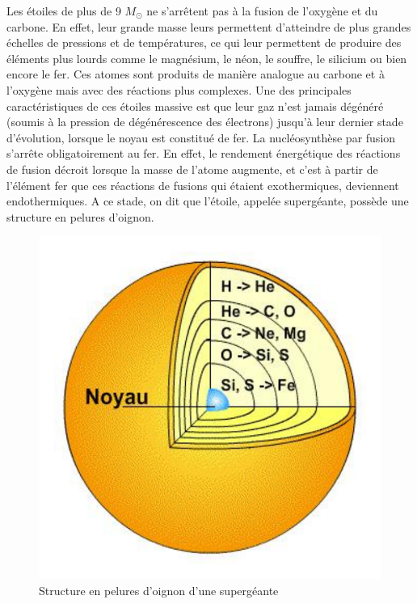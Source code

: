 Les étoiles de plus de 9 $M_\odot$ ne s’arrêtent pas à la fusion de l’oxygène et du carbone. En effet, leur grande masse leurs permettent d’atteindre de plus grandes échelles de pressions et de températures, ce qui leur permettent de produire des éléments plus lourds comme le magnésium, le néon, le souffre, le silicium ou bien encore le fer. Ces atomes sont produits de manière analogue au carbone et à l’oxygène mais avec des réactions plus complexes. Une des principales caractéristiques de ces étoiles massive est que leur gaz n’est jamais dégénéré (soumis à la pression de dégénérescence des électrons) jusqu’à leur dernier stade d’évolution, lorsque le noyau est constitué de fer. La nucléosynthèse par fusion s’arrête obligatoirement au fer. En effet, le rendement énergétique des réactions de fusion décroit lorsque la masse de l’atome augmente, et c’est à partir de l’élément fer que ces réactions de fusions qui étaient exothermiques, deviennent endothermiques. A ce stade, on dit que l’étoile, appelée supergéante, possède une structure en pelures d’oignon.\bigskip

\begin{figure}[H]
	\centering
	\includegraphics[scale=0.3]{images/oignon}
	\caption{Structure en pelures d'oignon d'une supergéante}
\end{figure}\newpage

